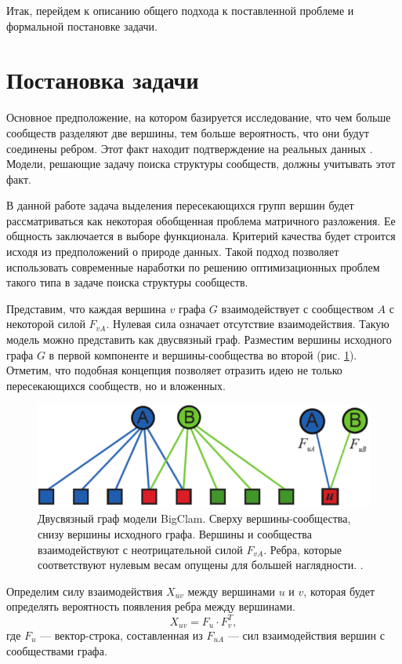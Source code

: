 \documentclass{ITaSconf}
\begin{document}
	Итак, перейдем к описанию общего подхода к поставленной проблеме и формальной постановке задачи.
	
	\section{Постановка задачи}
	
	Основное предположение, на котором базируется исследование, что чем больше сообществ разделяют две вершины, тем больше вероятность, что они будут соединены ребром. Этот факт находит подтверждение на реальных данных \cite{yang2013overlapping}. Модели, решающие задачу поиска структуры сообществ, должны учитывать этот факт.
	
	В данной работе задача выделения пересекающихся групп вершин будет рассматриваться как некоторая обобщенная проблема матричного разложения. Ее общность заключается в выборе функционала. Критерий качества будет строится исходя из предположений о природе данных. Такой подход позволяет использовать современные наработки по решению оптимизационных проблем такого типа в задаче поиска структуры сообществ.
	
	Представим, что каждая вершина $v$  графа $G$ взаимодействует с сообществом $A$ с некоторой силой $F_{vA}$. Нулевая сила означает отсутствие взаимодействия. Такую модель можно представить как двусвязный граф. Разместим вершины исходного графа $G$ в первой компоненте и вершины-сообщества во второй (рис. \ref{fig:AGM}). Отметим, что подобная концепция позволяет отразить идею не только пересекающихся сообществ, но и вложенных.
	\begin{figure}[!ht]
		\centering
		\includegraphics[width=\linewidth]{imgs/BigCLAM_model.png}
		\caption{Двусвязный граф модели BigClam. Сверху вершины-сообщества, снизу вершины исходного графа. Вершины и сообщества взаимодействуют с неотрицательной силой $F_{vA}$. Ребра, которые соответствуют нулевым весам опущены для большей наглядности. \cite{yang2013overlapping}.}
		\label{fig:AGM}
	\end{figure}
	Определим силу взаимодействия $X_{uv}$ между вершинами $u$ и $v$, которая будет определять вероятность появления ребра между вершинами.
	$$X_{uv} = F_{u} \cdot F_{v}^T,$$
	где $F_{u}$ --- вектор-строка, составленная из $F_{uA}$ --- сил взаимодействия вершин с сообществами графа.
	
\end{document}
